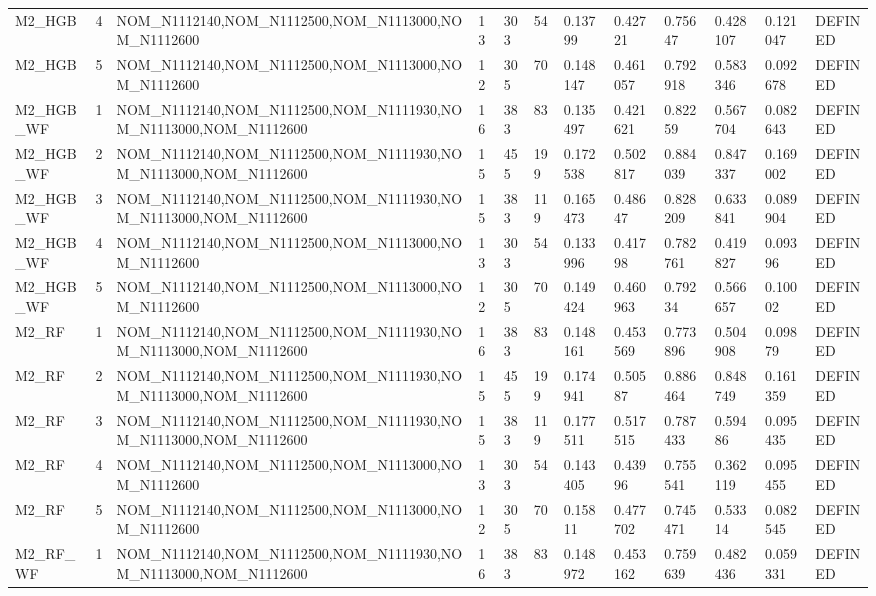 \begin{table}[ht]
\begin{tabular}{llllllllllll}
M2\_HGB & 4 & NOM\_N1112140,NOM\_N1112500,NOM\_N1113000,NOM\_N1112600 & 13 & 303 & 54 & 0.13799 & 0.42721 & 0.75647 & 0.428107 & 0.121047 & DEFINED \\
M2\_HGB & 5 & NOM\_N1112140,NOM\_N1112500,NOM\_N1113000,NOM\_N1112600 & 12 & 305 & 70 & 0.148147 & 0.461057 & 0.792918 & 0.583346 & 0.092678 & DEFINED \\
M2\_HGB\_WF & 1 & NOM\_N1112140,NOM\_N1112500,NOM\_N1111930,NOM\_N1113000,NOM\_N1112600 & 16 & 383 & 83 & 0.135497 & 0.421621 & 0.82259 & 0.567704 & 0.082643 & DEFINED \\
M2\_HGB\_WF & 2 & NOM\_N1112140,NOM\_N1112500,NOM\_N1111930,NOM\_N1113000,NOM\_N1112600 & 15 & 455 & 199 & 0.172538 & 0.502817 & 0.884039 & 0.847337 & 0.169002 & DEFINED \\
M2\_HGB\_WF & 3 & NOM\_N1112140,NOM\_N1112500,NOM\_N1111930,NOM\_N1113000,NOM\_N1112600 & 15 & 383 & 119 & 0.165473 & 0.48647 & 0.828209 & 0.633841 & 0.089904 & DEFINED \\
M2\_HGB\_WF & 4 & NOM\_N1112140,NOM\_N1112500,NOM\_N1113000,NOM\_N1112600 & 13 & 303 & 54 & 0.133996 & 0.41798 & 0.782761 & 0.419827 & 0.09396 & DEFINED \\
M2\_HGB\_WF & 5 & NOM\_N1112140,NOM\_N1112500,NOM\_N1113000,NOM\_N1112600 & 12 & 305 & 70 & 0.149424 & 0.460963 & 0.79234 & 0.566657 & 0.10002 & DEFINED \\
M2\_RF & 1 & NOM\_N1112140,NOM\_N1112500,NOM\_N1111930,NOM\_N1113000,NOM\_N1112600 & 16 & 383 & 83 & 0.148161 & 0.453569 & 0.773896 & 0.504908 & 0.09879 & DEFINED \\
M2\_RF & 2 & NOM\_N1112140,NOM\_N1112500,NOM\_N1111930,NOM\_N1113000,NOM\_N1112600 & 15 & 455 & 199 & 0.174941 & 0.50587 & 0.886464 & 0.848749 & 0.161359 & DEFINED \\
M2\_RF & 3 & NOM\_N1112140,NOM\_N1112500,NOM\_N1111930,NOM\_N1113000,NOM\_N1112600 & 15 & 383 & 119 & 0.177511 & 0.517515 & 0.787433 & 0.59486 & 0.095435 & DEFINED \\
M2\_RF & 4 & NOM\_N1112140,NOM\_N1112500,NOM\_N1113000,NOM\_N1112600 & 13 & 303 & 54 & 0.143405 & 0.43996 & 0.755541 & 0.362119 & 0.095455 & DEFINED \\
M2\_RF & 5 & NOM\_N1112140,NOM\_N1112500,NOM\_N1113000,NOM\_N1112600 & 12 & 305 & 70 & 0.15811 & 0.477702 & 0.745471 & 0.53314 & 0.082545 & DEFINED \\
M2\_RF\_WF & 1 & NOM\_N1112140,NOM\_N1112500,NOM\_N1111930,NOM\_N1113000,NOM\_N1112600 & 16 & 383 & 83 & 0.148972 & 0.453162 & 0.759639 & 0.482436 & 0.059331 & DEFINED \\

\end{tabular}
\end{table}
